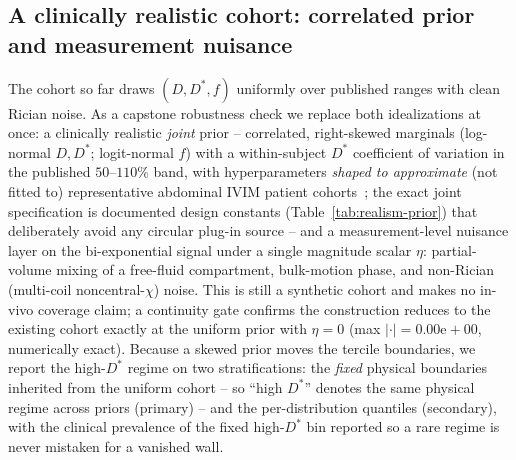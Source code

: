 \documentclass[11pt]{article}
\newcommand{\Dstar}{D^{*}}
\begin{document}
\subsection{A clinically realistic cohort: correlated prior and measurement nuisance}
\label{sec:realism}
The cohort so far draws $(D,\Dstar,f)$ uniformly over published ranges with clean
Rician noise. As a capstone robustness check we replace both idealizations at once:
a clinically realistic \emph{joint} prior -- correlated, right-skewed marginals
(log-normal $D,\Dstar$; logit-normal $f$) with a within-subject $\Dstar$
coefficient of variation in the published $50$--$110\%$ band, with hyperparameters
\emph{shaped to approximate} (not fitted to) representative abdominal IVIM patient
cohorts~\citep{gurneychampion2018,kaandorp2021,barbieri2020}; the exact joint
specification is documented design constants (Table~\ref{tab:realism-prior}) that
deliberately avoid any circular plug-in source -- and a measurement-level nuisance
layer on the bi-exponential signal under a single magnitude scalar $\eta$:
partial-volume mixing of a free-fluid compartment, bulk-motion phase, and
non-Rician (multi-coil noncentral-$\chi$) noise. This is still a synthetic cohort
and makes no in-vivo coverage claim; a continuity gate confirms the construction
reduces to the existing cohort exactly at the uniform prior with $\eta=0$ (max
$|\cdot|=0.00\mathrm{e}{+}00$, numerically exact). Because a skewed prior moves the
tercile boundaries, we report the high-$\Dstar$ regime on two stratifications: the
\emph{fixed} physical boundaries inherited from the uniform cohort -- so ``high
$\Dstar$'' denotes the same physical regime across priors (primary) -- and the
per-distribution quantiles (secondary), with the clinical prevalence of the fixed
high-$\Dstar$ bin reported so a rare regime is never mistaken for a vanished wall.
\end{document}
